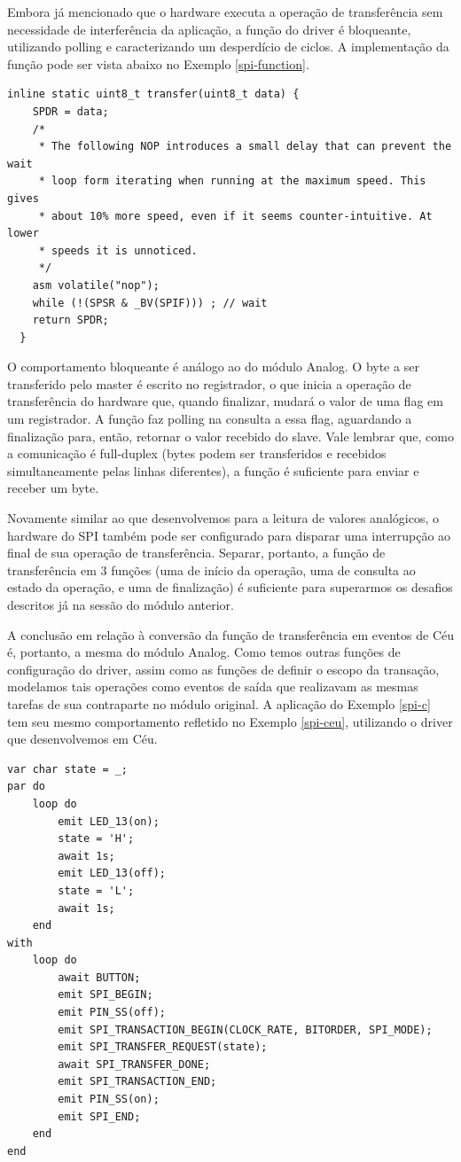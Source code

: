\documentclass[11pt]{article}
\begin{document}
\par Embora já mencionado que o hardware executa a operação de transferência sem necessidade de interferência da aplicação, a função do driver é bloqueante, utilizando polling e caracterizando um desperdício de ciclos. A implementação da função pode ser vista abaixo no Exemplo \ref{spi-function}. 
\begin{lstlisting}[style=CStyle,label=spi-function,caption=Implementação bloqueante da função de transferência SPI]
  inline static uint8_t transfer(uint8_t data) {
    SPDR = data;
    /*
     * The following NOP introduces a small delay that can prevent the wait
     * loop form iterating when running at the maximum speed. This gives
     * about 10% more speed, even if it seems counter-intuitive. At lower
     * speeds it is unnoticed.
     */
    asm volatile("nop");
    while (!(SPSR & _BV(SPIF))) ; // wait
    return SPDR;
  }
\end{lstlisting}
\par O comportamento bloqueante é análogo ao do módulo Analog. O byte a ser transferido pelo master é escrito no registrador, o que inicia a operação de transferência do hardware que, quando finalizar, mudará o valor de uma flag em um registrador. A função faz polling na consulta a essa flag, aguardando a finalização para, então, retornar o valor recebido do slave. Vale lembrar que, como a comunicação é full-duplex (bytes podem ser transferidos e recebidos simultaneamente pelas linhas diferentes), a função é suficiente para enviar e receber um byte.
\par Novamente similar ao que desenvolvemos para a leitura de valores analógicos, o hardware do SPI também pode ser configurado para disparar uma interrupção ao final de sua operação de transferência. Separar, portanto, a função de transferência em 3 funções (uma de início da operação, uma de consulta ao estado da operação, e uma de finalização) é suficiente para superarmos os desafios descritos já na sessão do módulo anterior. 
\par A conclusão em relação à conversão da função de transferência em eventos de Céu é, portanto, a mesma do módulo Analog. Como temos outras funções de configuração do driver, assim como as funções de definir o escopo da transação, modelamos tais operações como eventos de saída que realizavam as mesmas tarefas de sua contraparte no módulo original. A aplicação do Exemplo \ref{spi-c} tem seu mesmo comportamento refletido no Exemplo \ref{spi-ceu}, utilizando o driver que desenvolvemos em Céu.
\begin{lstlisting}[style=CStyle,label=spi-ceu,caption=Aplicação utilizando driver SPI em Céu]
var char state = _;
par do
    loop do
        emit LED_13(on);
        state = 'H';
        await 1s;
        emit LED_13(off);
        state = 'L';
        await 1s;
    end
with
    loop do
        await BUTTON;
        emit SPI_BEGIN;
        emit PIN_SS(off);
        emit SPI_TRANSACTION_BEGIN(CLOCK_RATE, BITORDER, SPI_MODE);
        emit SPI_TRANSFER_REQUEST(state);
        await SPI_TRANSFER_DONE;
        emit SPI_TRANSACTION_END;
        emit PIN_SS(on);
        emit SPI_END;
    end
end
\end{lstlisting}
\end{document}
